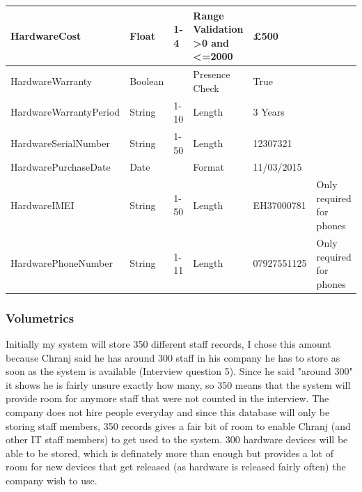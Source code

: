 \begin{center}
\begin{tabular}{|p{4cm}|p{1.3cm}|p{1.1cm}|p{1.7cm}|p{1.7cm}|p{2cm}|}
HardwareCost                       & Float                                 & 1-4                              & Range Validation \textgreater0 and \textless=2000                                    & £500                  &                       \\ \hline
HardwareWarranty                    & Boolean                                 &                                      & Presence Check                           & True                  &                       \\ \hline
HardwareWarrantyPeriod              & String                                  & 1-10                                 & Length                                   & 3 Years               &                       \\ \hline
HardwareSerialNumber                & String                                  & 1-50                                 & Length                                   & 12307321              &                       \\ \hline
HardwarePurchaseDate                & Date                                  &                                  & Format                                   & 11/03/2015              &                       \\ \hline
HardwareIMEI                & String                                  &          1-50                        & Length                                   & EH37000781               & Only required for phones                      \\ \hline
HardwarePhoneNumber                & String                                  &1-11                                  & Length                                   & 07927551125              &   Only required for phones                      \\ \hline
\end{tabular}
\end{center}

\subsubsection{Volumetrics}

Initially my system will store 350 different staff records, I chose this amount because Chranj said he has around 300 staff in his company he has to store as soon as the system is available (Interview question 5). Since he said "around 300" it shows he is fairly unsure exactly how many, so 350 means that the system will provide room for anymore staff that were not counted in the interview. The company does not hire people everyday and since this database will only be storing staff members, 350 records gives a fair bit of room to enable Chranj (and other IT staff members) to get used to the system. 300 hardware devices will be able to be stored, which is definately more than enough but provides a lot of room for new devices that get released (as hardware is released fairly often) the company wish to use.

